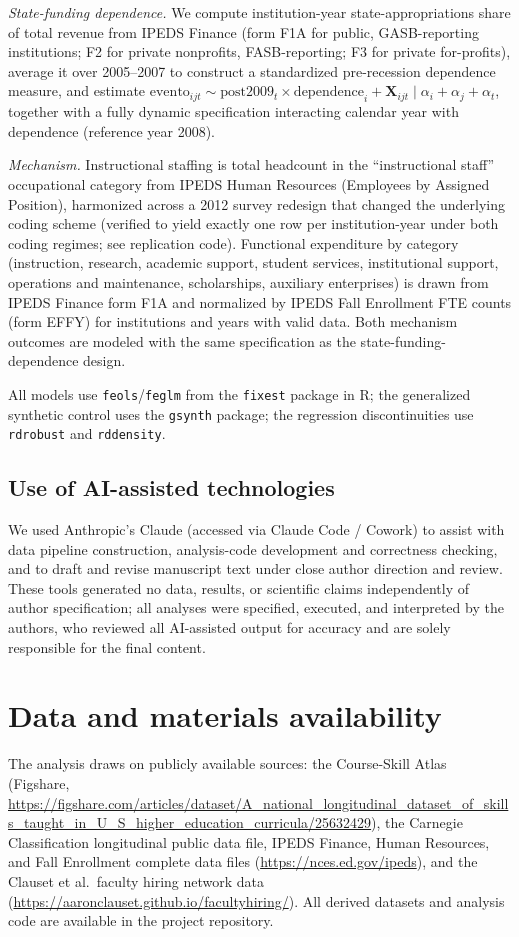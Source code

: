 \documentclass[11pt, letterpaper]{article}
\begin{document}
\emph{State-funding dependence.} We compute institution-year state-appropriations share of total revenue from IPEDS Finance (form F1A for public, GASB-reporting institutions; F2 for private nonprofits, FASB-reporting; F3 for private for-profits), average it over 2005--2007 to construct a standardized pre-recession dependence measure, and estimate $\mathrm{evento}_{ijt} \sim \mathrm{post}2009_t \times \mathrm{dependence}_i + \mathbf{X}_{ijt} \mid \alpha_i + \alpha_j + \alpha_t$, together with a fully dynamic specification interacting calendar year with dependence (reference year 2008).

\emph{Mechanism.} Instructional staffing is total headcount in the ``instructional staff'' occupational category from IPEDS Human Resources (Employees by Assigned Position), harmonized across a 2012 survey redesign that changed the underlying coding scheme (verified to yield exactly one row per institution-year under both coding regimes; see replication code). Functional expenditure by category (instruction, research, academic support, student services, institutional support, operations and maintenance, scholarships, auxiliary enterprises) is drawn from IPEDS Finance form F1A and normalized by IPEDS Fall Enrollment FTE counts (form EFFY) for institutions and years with valid data. Both mechanism outcomes are modeled with the same specification as the state-funding-dependence design.

All models use \texttt{feols}/\texttt{feglm} from the \texttt{fixest} package in R; the generalized synthetic control uses the \texttt{gsynth} package; the regression discontinuities use \texttt{rdrobust} and \texttt{rddensity}.

\subsection*{Use of AI-assisted technologies}
We used Anthropic's Claude (accessed via Claude Code / Cowork) to assist with data pipeline construction, analysis-code development and correctness checking, and to draft and revise manuscript text under close author direction and review. These tools generated no data, results, or scientific claims independently of author specification; all analyses were specified, executed, and interpreted by the authors, who reviewed all AI-assisted output for accuracy and are solely responsible for the final content.

\section*{Data and materials availability}
The analysis draws on publicly available sources: the Course-Skill Atlas (Figshare, \url{https://figshare.com/articles/dataset/A_national_longitudinal_dataset_of_skills_taught_in_U_S_higher_education_curricula/25632429}), the Carnegie Classification longitudinal public data file, IPEDS Finance, Human Resources, and Fall Enrollment complete data files (\url{https://nces.ed.gov/ipeds}), and the Clauset et al.\ faculty hiring network data (\url{https://aaronclauset.github.io/facultyhiring/}). All derived datasets and analysis code are available in the project repository.

\clearpage


\end{document}
